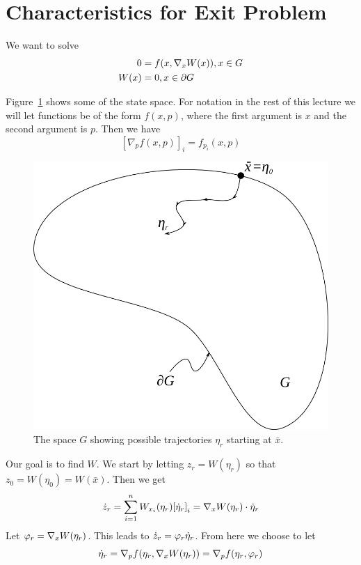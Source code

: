 \section{Characteristics for Exit Problem}
We want to solve
\begin{align*}
0 &= f(x,\nabla_xW(x)), x\in G \\
W(x) &= 0, x\in\partial G
\end{align*}

Figure~\ref{fig:15g} shows some of the state space.
For notation in the rest of this lecture we will let functions be of the form $f(x,p)$, where the first argument is $x$ and the second argument is $p$.
Then we have
$${[\nabla_p f(x,p)]}_i = f_{p_i}(x,p)$$

\begin{figure}[ht!]
\centering
\includegraphics[width=.4\textwidth]{images/15g}
\caption{The space $G$ showing possible trajectories $\eta_r$ starting at $\bar{x}$.}
\label{fig:15g}
\end{figure}

Our goal is to find $W$.
We start by letting $z_r=W(\eta_r)$ so that $z_0=W(\eta_0)=W(\bar{x})$.
Then we get
$$\dot{z}_r = \sum_{i=1}^n W_{x_i}(\eta_r){[\dot{\eta}_r]}_i = \nabla_xW(\eta_r)\cdot \dot{\eta}_r$$
Let $\varphi_r=\nabla_xW(\eta_r)$.
This leads to $\dot{z}_r=\varphi_r\dot{\eta}_r$.
From here we choose to let
$$\dot{\eta}_r = \nabla_p f(\eta_r,\nabla_xW(\eta_r)) = \nabla_p f(\eta_r,\varphi_r)$$

